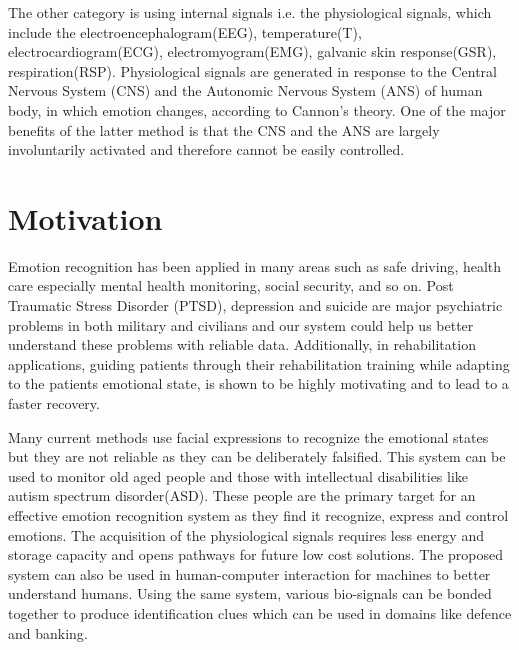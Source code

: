 \documentclass[11pt]{article}
\theoremstyle{definition}
\begin{document}
    The other category is using internal signals i.e. the physiological signals, which include the electroencephalogram(EEG), temperature(T), electrocardiogram(ECG), electromyogram(EMG), galvanic skin response(GSR), respiration(RSP).
    Physiological signals are generated in response to the Central Nervous System (CNS) and the Autonomic Nervous System (ANS) of human body, in which emotion changes, according to Cannon’s theory\cite{cannon_james-lange_1927}.
    One of the major benefits of the latter method is that the CNS and the ANS are largely involuntarily activated and therefore cannot be easily controlled.

  \section{Motivation}
    Emotion recognition has been applied in many areas such as safe driving\cite{de_nadai_enhancing_2016}, health care\cite{guo_pervasive_2013} especially mental health monitoring\cite{verschuere_psychopathy_2006}, social security\cite{noauthor_facial_nodate}, and so on. 
    Post Traumatic Stress Disorder (PTSD), depression and suicide are major psychiatric problems in both military and civilians\cite{bryan_combat_2013, tarrier_suicide_2004} and our system could help us better understand these problems with reliable data.
    Additionally, in rehabilitation applications, guiding patients through their rehabilitation training while adapting to the patients emotional state, is shown to be highly motivating and to lead to a faster recovery\cite{evans_positive_2011}.

    Many current methods use facial expressions to recognize the emotional states but they are not reliable as they can be deliberately falsified\cite{cannon_james-lange_1927}.
    This system can be used to monitor old aged people and those with intellectual disabilities like autism spectrum disorder(ASD). 
    These people are the primary target for an effective emotion recognition system as they find it recognize, express and control emotions\cite{sparks_brain_2002}.
    The acquisition of the physiological signals requires less energy and storage capacity and opens pathways for future low cost solutions. 
    The proposed system can also be used in human-computer interaction for machines to better understand humans\cite{molina_emotional_2009}. 
    Using the same system, various bio-signals can be bonded together to produce identification clues which can be used in domains like defence and banking\cite{kim_biometric_2009}.
\end{document}
